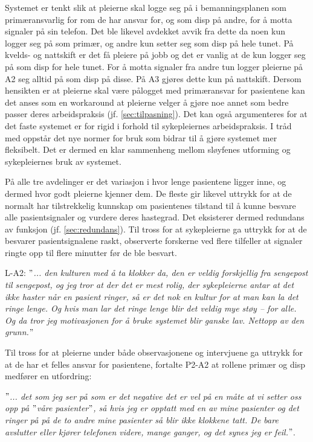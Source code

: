 \noindent
Systemet er tenkt slik at pleierne skal logge seg på i bemanningsplanen som primæransvarlig for rom de har ansvar for, og som disp på andre, for å motta signaler på sin telefon. Det ble likevel avdekket avvik fra dette da noen kun logger seg på som primær, og andre kun setter seg som disp på hele tunet. På kvelds- og nattskift er det få pleiere på jobb og det er vanlig at de kun logger seg på som disp for hele tunet. For å motta signaler fra andre tun logger pleierne på A2 seg alltid på som disp på disse. På A3 gjøres dette kun på nattskift. Dersom hensikten er at pleierne skal være pålogget med primæransvar for pasientene kan det anses som en workaround at pleierne velger å gjøre noe annet som bedre passer deres arbeidspraksis (jf. \ref{sec:tilpasning}). Det kan også argumenteres for at det faste systemet er for rigid i forhold til sykepleiernes arbeidspraksis. I tråd med \citep{Ackerman00} oppstår det nye normer for bruk som bidrar til å gjøre systemet mer fleksibelt. Det er dermed en klar sammenheng mellom sløyfenes utforming og sykepleiernes bruk av systemet.

\noindent
På alle tre avdelinger er det variasjon i hvor lenge pasientene ligger inne, og dermed hvor godt pleierne kjenner dem. De fleste gir likevel uttrykk for at de normalt har tilstrekkelig kunnskap om pasientenes tilstand til å kunne besvare alle pasientsignaler og vurdere deres hastegrad. Det eksisterer dermed redundans av funksjon (jf. \ref{sec:redundans}). Til tross for at sykepleierne ga uttrykk for at de besvarer pasientsignalene raskt, observerte forskerne ved flere tilfeller at signaler ringte opp til flere minutter før de ble besvart.

\noindent
L-A2: \textit{$"$... den kulturen med å ta klokker da, den er veldig forskjellig fra sengepost til sengepost, og jeg tror at der det er mest rolig, der sykepleierne antar at det ikke haster når en pasient ringer, så er det nok en kultur for at man kan la det ringe lenge. Og hvis man lar det ringe lenge blir det veldig mye støy – for alle. Og da tror jeg motivasjonen for å bruke systemet blir ganske lav. Nettopp av den grunn.$"$}

\noindent
Til tross for at pleierne under både observasjonene og intervjuene ga uttrykk for at de har et felles ansvar for pasientene, fortalte P2-A2 at rollene primær og disp medfører en utfordring:

\noindent
\textit{$"$... det som jeg ser på som er det negative det er vel på en måte at vi setter oss opp på $"$våre pasienter$"$, så hvis jeg er opptatt med en av mine pasienter og det ringer på på de to andre mine pasienter så blir ikke klokkene tatt. De bare avslutter eller kjører telefonen videre, mange ganger, og det synes jeg er feil.$"$}.  
  
